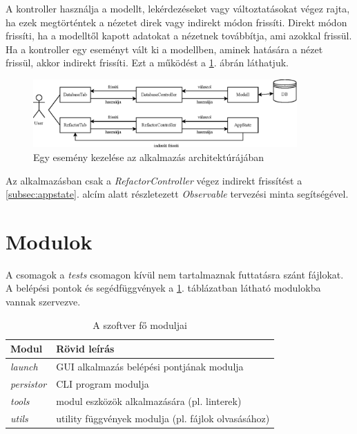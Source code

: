 A kontroller használja a modellt, lekérdezéseket vagy változtatásokat végez rajta,
ha ezek megtörténtek a nézetet direk vagy indirekt módon frissíti.
Direkt módon frissíti, ha a modelltől kapott adatokat a nézetnek továbbítja,
ami azokkal frissül.
Ha a kontroller egy eseményt vált ki a modellben, aminek hatására a nézet frissül,
akkor indirekt frissíti.
Ezt a működést a \ref{fig:MVC}. ábrán láthatjuk.

\begin{figure}[H]
	\centering
	\includegraphics[width=0.9\textwidth]{images/figs/MVC.eps}
	\caption{\label{fig:MVC}Egy esemény kezelése az alkalmazás architektúrájában}
\end{figure}

Az alkalmazásban csak a \emph{RefactorController} végez indirekt frissítést a
\ref{subsec:appstate}. alcím alatt részletezett \emph{Observable} tervezési minta
segítségével. 

\section{Modulok}
\label{sec:modules}

A csomagok a \emph{tests} csomagon kívül nem tartalmaznak futtatásra szánt fájlokat.
A belépési pontok és segédfüggvények a \ref{tab:modules}. táblázatban
látható modulokba vannak szervezve.

\begin{table}[H]
	\centering
	\begin{tabular}{ | m{} | m{} | }
		\hline
		\textbf{Modul} & \textbf{Rövid leírás} \\
		\hline \hline
		\emph{launch} & GUI alkalmazás belépési pontjának modulja \\
		\hline
		\emph{persistor} & CLI program modulja \\
		\hline
		\emph{tools} & modul eszközök alkalmazására (pl. linterek) \\
		\hline
		\emph{utils} & utility függvények modulja (pl. fájlok olvasásához)  \\
		\hline
	\end{tabular}
	\caption{A szoftver fő moduljai}
	\label{tab:modules}
\end{table}


